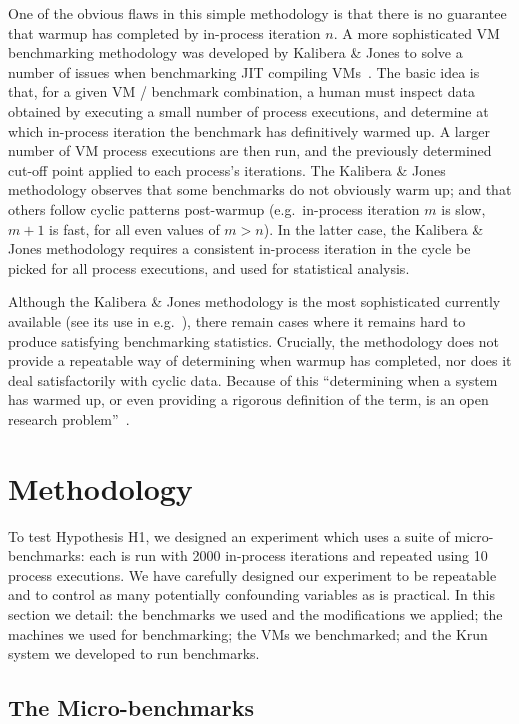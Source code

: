 \documentclass[preprint,numbers,10pt]{sigplanconf}
\newcommand{\kalibera}{Kalibera \& Jones\xspace}
\newcommand{\krun}{Krun\xspace}
\begin{document}
One of the obvious flaws in this simple methodology is that there is no guarantee
that warmup has completed by in-process iteration $n$. A more sophisticated VM benchmarking methodology
was developed by \kalibera to solve a number of issues when benchmarking JIT
compiling VMs~\cite{kalibera12quantifying,kalibera13rigorous}. The basic idea is
that, for a given VM / benchmark combination, a human must inspect data obtained by
executing a small number of process executions, and determine at which in-process iteration the
benchmark has definitively warmed up. A larger number of VM process executions are then
run, and the previously determined cut-off point applied to each process's
iterations. The \kalibera methodology observes that some benchmarks do not
obviously warm up; and that others follow cyclic patterns post-warmup
(e.g.~in-process iteration $m$ is slow, $m+1$ is fast, for all even values of $m > n$). In
the latter case, the \kalibera methodology requires a consistent in-process iteration in
the cycle be picked for all process executions, and used for statistical analysis.

Although the \kalibera methodology is the most
sophisticated currently available (see its use in
e.g.~\cite{barrett15approaches,grimmer15dynamically}),
there remain cases where it remains hard to produce
satisfying benchmarking statistics. Crucially, the methodology does not
provide a repeatable way of determining when warmup has completed, nor does it
deal satisfactorily with cyclic data. Because of this
``determining when a system has warmed up, or even providing a
rigorous definition of the term, is an open research problem''~\cite{seaton15phd}.


\section{Methodology}
\label{sec:methodology}

To test Hypothesis H1, we designed an experiment which uses a suite of
micro-benchmarks: each is run with 2000 in-process iterations and repeated
using 10 process executions. We have carefully designed our
experiment to be repeatable and to control as many potentially confounding variables as
is practical. In this section we detail: the benchmarks we used and the modifications we
applied; the machines we used for benchmarking; the VMs we benchmarked; and the
\krun system we developed to run benchmarks.


\subsection{The Micro-benchmarks}
\end{document}
